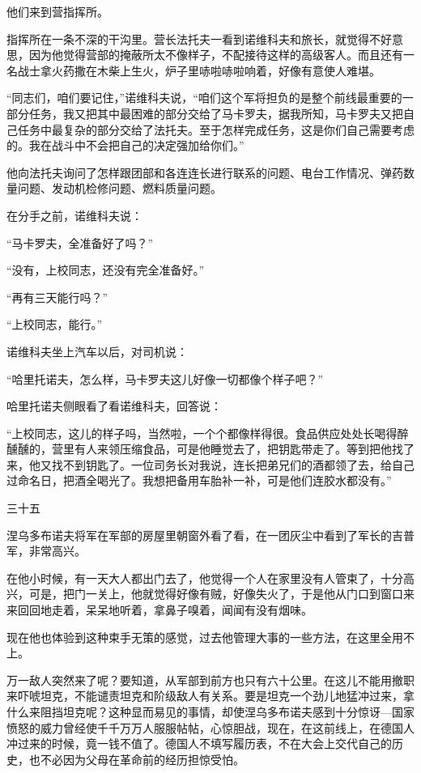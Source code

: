 他们来到营指挥所。

指挥所在一条不深的干沟里。营长法托夫一看到诺维科夫和旅长，就觉得不好意思，因为他觉得营部的掩蔽所太不像样子，不配接待这样的高级客人。而且还有一名战士拿火药撒在木柴上生火，炉子里哧啦哧啦响着，好像有意使人难堪。

“同志们，咱们要记住，”诺维科夫说，“咱们这个军将担负的是整个前线最重要的一部分任务，我又把其中最困难的部分交给了马卡罗夫，据我所知，马卡罗夫又把自己任务中最复杂的部分交给了法托夫。至于怎样完成任务，这是你们自己需要考虑的。我在战斗中不会把自己的决定强加给你们。”

他向法托夫询问了怎样跟团部和各连连长进行联系的问题、电台工作情况、弹药数量问题、发动机检修问题、燃料质量问题。

在分手之前，诺维科夫说：

“马卡罗夫，全准备好了吗？”

“没有，上校同志，还没有完全准备好。”

“再有三天能行吗？”

“上校同志，能行。”

诺维科夫坐上汽车以后，对司机说：

“哈里托诺夫，怎么样，马卡罗夫这儿好像一切都像个样子吧？”

哈里托诺夫侧眼看了看诺维科夫，回答说：

“上校同志，这儿的样子吗，当然啦，一个个都像样得很。食品供应处处长喝得醉醺醺的，营里有人来领压缩食品，可是他睡觉去了，把钥匙带走了。等到把他找了来，他又找不到钥匙了。一位司务长对我说，连长把弟兄们的酒都领了去，给自己过命名日，把酒全喝光了。我想把备用车胎补一补，可是他们连胶水都没有。”

三十五

涅乌多布诺夫将军在军部的房屋里朝窗外看了看，在一团灰尘中看到了军长的吉普军，非常高兴。

在他小时候，有一天大人都出门去了，他觉得一个人在家里没有人管束了，十分高兴，可是，把门一关上，他就觉得好像有贼，好像失火了，于是他从门口到窗口来来回回地走着，呆呆地听着，拿鼻子嗅着，闻闻有没有烟味。

现在他也体验到这种束手无策的感觉，过去他管理大事的一些方法，在这里全用不上。

万一敌人突然来了呢？要知道，从军部到前方也只有六十公里。在这儿不能用撤职来吓唬坦克，不能谴责坦克和阶级敌人有关系。要是坦克一个劲儿地猛冲过来，拿什么来阻挡坦克呢？这种显而易见的事情，却使涅乌多布诺夫感到十分惊讶—国家愤怒的威力曾经使千千万万人服服帖帖，心惊胆战，现在，在这前线上，在德国人冲过来的时候，竟一钱不值了。德国人不填写履历表，不在大会上交代自己的历史，也不必因为父母在革命前的经历担惊受怕。

